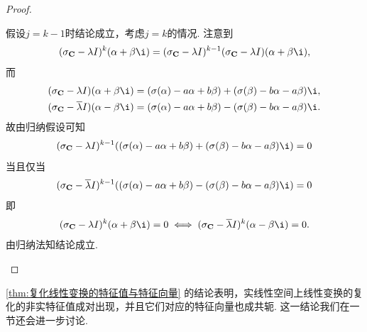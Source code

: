 \begin{proof}
\begin{enumerate}
              假设$j=k-1$时结论成立，考虑$j=k$的情况. 注意到
              \[
              (\sigma_{\mathbf{C}}-\lambda I)^k(\alpha+\beta\i)=(\sigma_{\mathbf{C}}-\lambda I)^{k-1}(\sigma_{\mathbf{C}}-\lambda I)(\alpha+\beta\i),
              \]
              而
              \begin{gather*}
                (\sigma_{\mathbf{C}}-\lambda I)(\alpha+\beta\i)=(\sigma(\alpha)-a\alpha+b\beta)+(\sigma(\beta)-b\alpha-a\beta)\i, \\
                (\sigma_{\mathbf{C}}-\overline{\lambda} I)(\alpha-\beta\i)=(\sigma(\alpha)-a\alpha+b\beta)-(\sigma(\beta)-b\alpha-a\beta)\i.
              \end{gather*}
              故由归纳假设可知
              \[
              (\sigma_{\mathbf{C}}-\lambda I)^{k-1}((\sigma(\alpha)-a\alpha+b\beta)+(\sigma(\beta)-b\alpha-a\beta)\i)=0
              \]
              当且仅当
              \[
              (\sigma_{\mathbf{C}}-\overline{\lambda} I)^{k-1}((\sigma(\alpha)-a\alpha+b\beta)-(\sigma(\beta)-b\alpha-a\beta)\i)=0
              \]
              即\[(\sigma_{\mathbf{C}}-\lambda I)^k(\alpha+\beta\i)=0 \iff (\sigma_{\mathbf{C}}-\overline{\lambda} I)^k(\alpha-\beta\i)=0.\]
              由归纳法知结论成立.
    \end{enumerate}
\end{proof}

\autoref{thm:复化线性变换的特征值与特征向量} 的结论表明，实线性空间上线性变换的复化的非实特征值成对出现，并且它们对应的特征向量也成共轭. 这一结论我们在一节还会进一步讨论.

